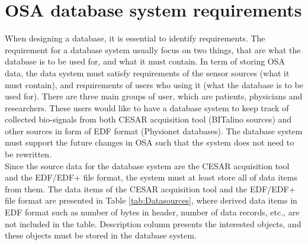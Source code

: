 \section{OSA database system requirements}
When designing a database, it is essential to identify requirements. The requirement for a database system usually focus on two things, that are what the database is to be used for, and what it must contain. In term of storing OSA data, the data system must satisfy requirements of the sensor sources (what it must contain), and requirements of users who using it (what the database is to be used for). There are three main groups of user, which are patients, physicians and researchers. These users would like to have a database system to keep track of collected bio-signals from both CESAR acquisition tool (BITalino sources) and other sources in form of EDF format (Physionet databases). The database system must support the future changes in OSA such that the system does not need to be rewritten.\\
Since the source data for the database system are the CESAR acquisition tool and the EDF/EDF+ file format, the system must at least store all of data items from them. The data items of the CESAR acquisition tool and the EDF/EDF+ file format are presented in Table \ref{tab:Datasources}, where derived data items in EDF format such as number of bytes in header, number of data records, etc., are not included in the table. Description column presents the interested objects, and these objects must be stored in the database system.
